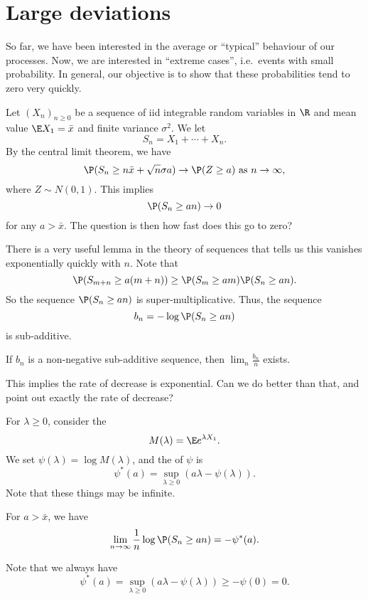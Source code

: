 \documentclass[a4paper]{article}
\begin{document}
\section{Large deviations}
So far, we have been interested in the average or ``typical'' behaviour of our processes. Now, we are interested in ``extreme cases'', i.e.\ events with small probability. In general, our objective is to show that these probabilities tend to zero very quickly.

Let $(X_n)_{n \geq 0}$ be a sequence of iid integrable random variables in $\R$ and mean value $\E X_1 = \bar{x}$ and finite variance $\sigma^2$. We let
\[
  S_n = X_1 + \cdots + X_n.
\]
By the central limit theorem, we have
\[
  \P(S_n \geq n \bar{x} + \sqrt{n} \sigma a) \to \P(Z \geq a)\text{ as }n \to \infty,
\]
where $Z \sim N(0, 1)$. This implies
\[
  \P(S_n \geq an) \to 0
\]
for any $a > \bar{x}$. The question is then how fast does this go to zero?

There is a very useful lemma in the theory of sequences that tells us this vanishes exponentially quickly with $n$. Note that
\[
  \P(S_{m + n} \geq a (m + n))\geq \P(S_m \geq am) \P(S_n \geq an).
\]
So the sequence $\P(S_n \geq an)$ is super-multiplicative. Thus, the sequence
\[
  b_n = -\log \P (S_n \geq an)
\]
is sub-additive.

\begin{lemma}[Fekete]
  If $b_n$ is a non-negative sub-additive sequence, then $\lim_n \frac{b_n}{n}$ exists.
\end{lemma}

This implies the rate of decrease is exponential. Can we do better than that, and point out exactly the rate of decrease?

For $\lambda \geq 0$, consider the 
\[
  M(\lambda) = \E e^{\lambda X_1}.
\]
We set $\psi(\lambda) = \log M(\lambda)$, and the  of $\psi$ is
\[
  \psi^*(a) = \sup_{\lambda \geq 0} (a\lambda - \psi (\lambda)).
\]
Note that these things may be infinite.

\begin{thm}
  For $a > \bar{x}$, we have
  \[
    \lim_{n \to \infty} \frac{1}{n} \log \P(S_n \geq an) = - \psi^*(a).
  \]
\end{thm}
Note that we always have
\[
  \psi^*(a) = \sup_{\lambda \geq 0} (a\lambda - \psi(\lambda)) \geq -\psi(0) = 0.
\]
\end{document}
